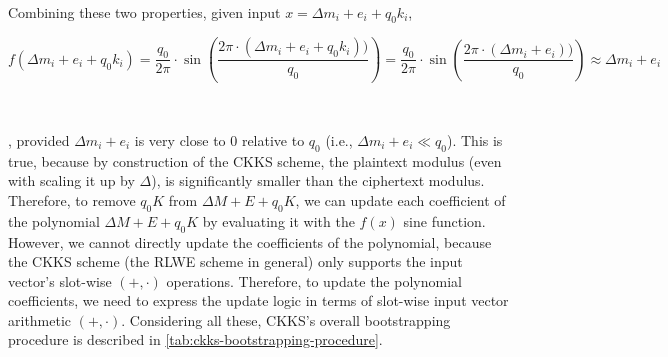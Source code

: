 $ $

Combining these two properties, given input $x = \Delta m_i + e_i + q_0k_i$, 

$f(\Delta m_i + e_i + q_0k_i) = \dfrac{q_0}{2\pi}\cdot \sin \left(\dfrac{2\pi \cdot (\Delta m_i + e_i + q_0k_i))}{q_0}\right) = \dfrac{q_0}{2\pi}\cdot \sin \left(\dfrac{2\pi \cdot (\Delta m_i + e_i))}{q_0}\right) \approx \Delta m_i + e_i$

$ $


, provided $\Delta m_i + e_i$ is very close to 0 relative to $q_0$ (i.e., $\Delta m_i + e_i \ll q_0$). This is true, because by construction of the CKKS scheme, the plaintext modulus (even with scaling it up by $\Delta$), is significantly smaller than the ciphertext modulus. Therefore, to remove $q_0K$ from $\Delta M + E + q_0K$, we can update each coefficient of the polynomial $\Delta M + E + q_0K$ by evaluating it with the $f(x)$ sine function. However, we cannot directly update the coefficients of the polynomial, because the CKKS scheme (the RLWE scheme in general) only supports the input vector's slot-wise $(+, \cdot)$ operations. Therefore, to update the polynomial coefficients, we need to express the update logic in terms of slot-wise input vector arithmetic $(+, \cdot)$. Considering all these, CKKS's overall bootstrapping procedure is described in \autoref{tab:ckks-bootstrapping-procedure}.


